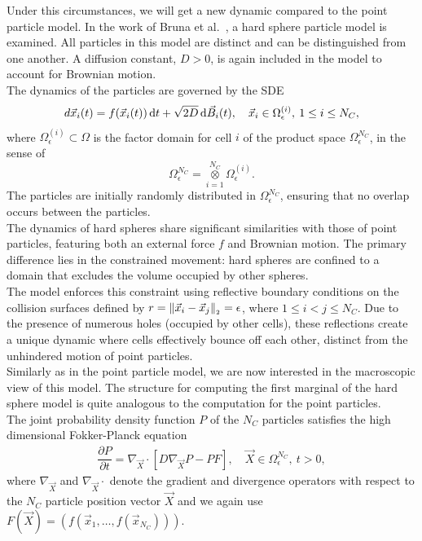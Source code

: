 Under this circumstances, we will get a new dynamic compared to the point particle model.  
In the work of Bruna et al.~\cite{Bruna2012}, a hard sphere particle model is examined.
All particles in this model are distinct and can be distinguished from one another. 
A diffusion constant, $D>0$, is again included in the model to account for Brownian motion. \\
The dynamics of the particles are governed by the SDE
\begin{align*}
	d\vec{x}_i(t) = f(\vec{x}_i(t)) \, \mathrm{d} t + \sqrt{2D} \, \mathrm{d} \vec{B}_i(t), \quad \vec{x}_i \in \Omega_{\epsilon}^{(i)}, \: 1 \leq i \leq N_C,
\end{align*}
where $\Omega_{\epsilon}^{(i)} \subset \Omega$ is the factor domain for cell $i$ of the product space $\Omega_{\epsilon}^{N_C}$, in the sense of 
\[
	\Omega_{\epsilon}^{N_C} =  \mathop{\otimes}\limits_{i=1}^{N_C} \Omega_{\epsilon}^{(i)}. 
\]
The particles are initially randomly distributed in $\Omega^{N_C}_{\epsilon}$, ensuring that no overlap occurs between the particles. \\
The dynamics of hard spheres share significant similarities with those of point particles, featuring both an external force $f$ and Brownian motion. 
The primary difference lies in the constrained movement: hard spheres are confined to a domain that excludes the volume occupied by other spheres. \\
The model enforces this constraint using reflective boundary conditions on the collision surfaces defined by $r = \norm[\vec{x}_i - \vec{x}_j] = \epsilon$, where $1 \leq i < j \leq N_C$. 
Due to the presence of numerous holes (occupied by other cells), these reflections create a unique dynamic where cells effectively bounce off each other, distinct from the unhindered motion of point particles. \\
Similarly as in the point particle model, we are now interested in the macroscopic view of this model. 
The structure for computing the first marginal of the hard sphere model is quite analogous to the computation for the point particles. \\
The joint probability density function $P$ of the $N_C$ particles satisfies the high dimensional Fokker-Planck equation
\begin{align*}
	\dfrac{\partial P}{\partial t} = \nabla_{\vec{X}} \cdot [ D \nabla_{\vec{X}} P - P F], \quad \vec{X} \in \Omega_{\epsilon}^{N_C}, \: t > 0,
\end{align*}
where $\nabla_{\vec{X}}$ and $\nabla_{\vec{X}} \cdot$ denote the gradient and divergence operators with respect to the $N_C$ particle position vector $\vec{X}$ and we again use $F(\vec{X}) = (f(\vec{x}_1, \ldots, f(\vec{x}_{N_C})))$. \\
